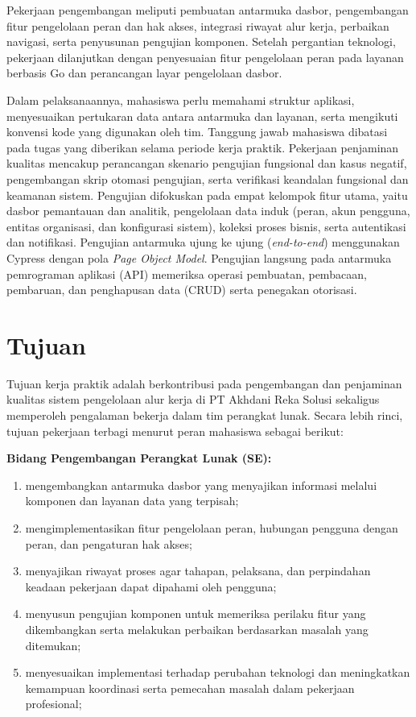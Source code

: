 Pekerjaan pengembangan meliputi pembuatan antarmuka dasbor, pengembangan fitur pengelolaan peran dan hak akses, integrasi riwayat alur kerja, perbaikan navigasi, serta penyusunan pengujian komponen. Setelah pergantian teknologi, pekerjaan dilanjutkan dengan penyesuaian fitur pengelolaan peran pada layanan berbasis Go dan perancangan layar pengelolaan dasbor.

Dalam pelaksanaannya, mahasiswa perlu memahami struktur aplikasi, menyesuaikan pertukaran data antara antarmuka dan layanan, serta mengikuti konvensi kode yang digunakan oleh tim. Tanggung jawab mahasiswa dibatasi pada tugas yang diberikan selama periode kerja praktik. Pekerjaan penjaminan kualitas mencakup perancangan skenario pengujian fungsional dan kasus negatif, pengembangan skrip otomasi pengujian, serta verifikasi keandalan fungsional dan keamanan sistem. Pengujian difokuskan pada empat kelompok fitur utama, yaitu dasbor pemantauan dan analitik, pengelolaan data induk (peran, akun pengguna, entitas organisasi, dan konfigurasi sistem), koleksi proses bisnis, serta autentikasi dan notifikasi. Pengujian antarmuka ujung ke ujung (\textit{end-to-end}) menggunakan Cypress dengan pola \textit{Page Object Model}. Pengujian langsung pada antarmuka pemrograman aplikasi (API) memeriksa operasi pembuatan, pembacaan, pembaruan, dan penghapusan data (CRUD) serta penegakan otorisasi.

\section{Tujuan}
Tujuan kerja praktik adalah berkontribusi pada pengembangan dan penjaminan kualitas sistem pengelolaan alur kerja di PT Akhdani Reka Solusi sekaligus memperoleh pengalaman bekerja dalam tim perangkat lunak. Secara lebih rinci, tujuan pekerjaan terbagi menurut peran mahasiswa sebagai berikut:

\noindent\textbf{Bidang Pengembangan Perangkat Lunak (SE):}
\begin{enumerate}[label=\arabic*)]
\item mengembangkan antarmuka dasbor yang menyajikan informasi melalui komponen dan layanan data yang terpisah;
\item mengimplementasikan fitur pengelolaan peran, hubungan pengguna dengan peran, dan pengaturan hak akses;
\item menyajikan riwayat proses agar tahapan, pelaksana, dan perpindahan keadaan pekerjaan dapat dipahami oleh pengguna;
\item menyusun pengujian komponen untuk memeriksa perilaku fitur yang dikembangkan serta melakukan perbaikan berdasarkan masalah yang ditemukan;
\item menyesuaikan implementasi terhadap perubahan teknologi dan meningkatkan kemampuan koordinasi serta pemecahan masalah dalam pekerjaan profesional;
\end{enumerate}

